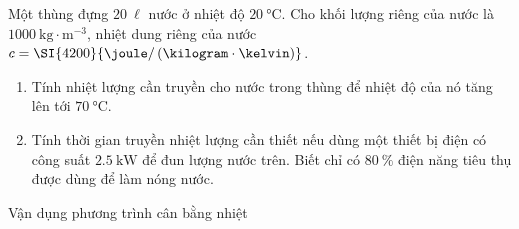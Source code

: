 	
\begin{vd}
Một thùng đựng $\SI{20}{\ell}$ nước ở nhiệt độ $\SI{20}{\celsius}$. Cho khối lượng riêng của nước là $\SI{1000}{\kilogram\cdot\meter^{-3}}$, nhiệt dung riêng của nước $c=\SI{4200}{\joule/\left(\kilogram\cdot\kelvin\right)}$.
			\begin{enumerate}[label=\alph*)]
				\item Tính nhiệt lượng cần truyền cho nước trong thùng để nhiệt độ của nó tăng lên tới $\SI{70}{\celsius}$.
				\item Tính thời gian truyền nhiệt lượng cần thiết nếu dùng một thiết bị điện có công suất $\SI{2.5}{\kilo\watt}$ để đun lượng nước trên. Biết chỉ có $\SI{80}{\percent}$ điện năng tiêu thụ được dùng để làm nóng nước.
			\end{enumerate}
		
\end{vd}
\begin{dang}{Vận dụng phương trình cân bằng nhiệt}
	\end{dang}

